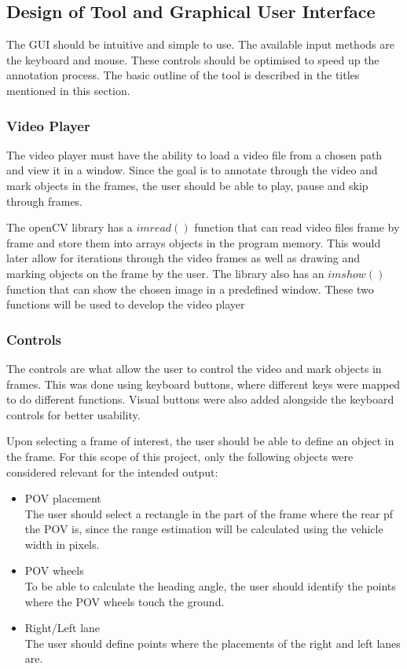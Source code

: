\subsection{Design of Tool and Graphical User Interface}


The GUI should be intuitive and simple to use. The available input methods are the keyboard and mouse. These controls should be optimised to speed up the annotation process. The basic outline of the tool is described in the titles mentioned in this section.

\subsubsection{Video Player}
The video player must have the ability to load a video file from a chosen path and view it in a window. Since the goal is to annotate through the video and mark objects in the frames, the user should be able to play, pause and skip through frames.

The openCV library has a $imread()$ function that can read video files frame by frame and store them into arrays objects in the program memory. This would later allow for iterations through the video frames as well as drawing and marking objects on the frame by the user. The library also has an $imshow()$ function that can show the chosen image in a predefined window. These two functions will be used to develop the video player

\subsubsection{Controls}
The controls are what allow the user to control the video and mark objects in frames. This was done using keyboard buttons, where different keys were mapped to do different functions. Visual buttons were also added alongside the keyboard controls for better usability. 



Upon selecting a frame of interest, the user should be able to define an object in the frame. For this scope of this project, only the following objects were considered relevant for the intended output:

\begin{itemize}
    \item POV placement\\
    The user should select a rectangle in the part of the frame where the rear pf the POV is, since the range estimation will be calculated using the vehicle width in pixels. 
    \item POV wheels\\
    To be able to calculate the heading angle, the user should identify the points where the POV wheels touch the ground. 
    \item Right/Left lane\\
    The user should define points where the placements of the right and left lanes are.
\end{itemize}

